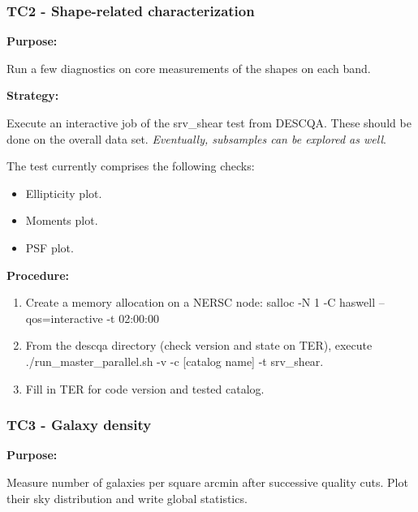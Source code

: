 \documentclass[12pt, a4paper]{article}
\begin{document}
\subsubsection{TC2 - Shape-related characterization}
\textbf{Purpose:} 

Run a few diagnostics on core measurements of the shapes on each band. 

\textbf{Strategy:} 

Execute an interactive job of the srv\_shear test from DESCQA. These should be done on the overall data set.  \textit{Eventually, subsamples can be explored as well}.

The test currently comprises the following checks:
\begin{itemize}
	\item Ellipticity plot. 
	\item Moments plot.
	\item PSF plot.
\end{itemize}

\textbf{Procedure:} 

\begin{enumerate}
	\item Create a memory allocation on a NERSC node: salloc -N 1 -C haswell --qos=interactive -t 02:00:00
	\item From the descqa directory (check version and state on TER), execute ./run\_master\_parallel.sh -v -c [catalog name] -t srv\_shear. 
	\item Fill in TER for code version and tested catalog.
\end{enumerate}

\subsubsection{TC3 - Galaxy density}
\textbf{Purpose:} 

Measure number of galaxies per square arcmin after successive quality cuts. Plot their sky distribution and write global statistics.
\end{document}

